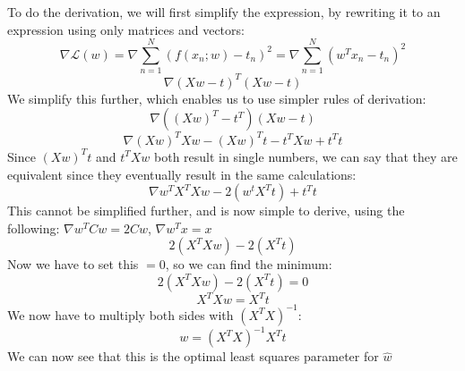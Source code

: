 To do the derivation, we will first simplify the expression, by rewriting it to an expression using only matrices and vectors:
$$
\nabla \mathcal{L}(w) = \nabla \sum_{n=1}^N (f(x_n;w)-t_n)^2 = \nabla \sum_{n=1}^N (w^Tx_n-t_n)^2
$$
$$
\nabla (Xw-t)^T(Xw-t)
$$
We simplify this further, which enables us to use simpler rules of derivation:
$$
\nabla ((Xw)^T-t^T)(Xw-t)
$$
$$
\nabla (Xw)^TXw-(Xw)^Tt-t^TXw + t^Tt
$$
Since $(Xw)^Tt$ and $t^TXw$ both result in single numbers, we can say that they are equivalent since they eventually result in the same calculations:
$$
\nabla w^TX^TXw-2(w^tX^Tt)+t^Tt
$$
This cannot be simplified further, and is now simple to derive, using the following: $\nabla w^TCw = 2Cw$, $\nabla w^Tx = x$
$$
2(X^TXw)-2(X^Tt)
$$
Now we have to set this $= 0$, so we can find the minimum:
$$
2(X^TXw)-2(X^Tt) = 0
$$
$$
X^TXw = X^Tt
$$
We now have to multiply both sides with $(X^TX)^{-1}$:
$$
w = (X^TX)^{-1}X^Tt
$$
We can now see that this is the optimal least squares parameter for $\hat w$